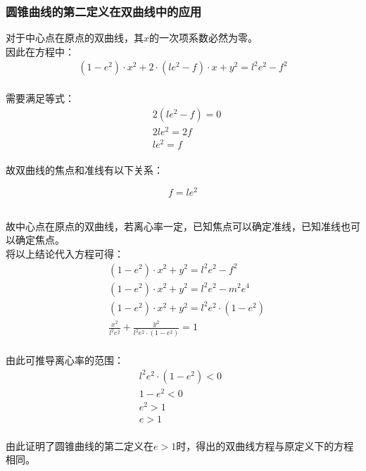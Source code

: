 \documentclass[UTF8]{ctexart}
\begin{document}
\subsubsection{圆锥曲线的第二定义在双曲线中的应用}
    \setcounter{equation}{0}
    对于中心点在原点的双曲线，其$x$的一次项系数必然为零。\\[3mm]
    因此在方程中：
    \begin{align}
        \left(1-e^2\right)\cdot x^2+2\cdot\left(le^2-f\right)\cdot x+y^2=l^2e^2-f^2
    \end{align}\\
    需要满足等式：
    \begin{align}
        &2(le^2-f)=0\\[3mm]
        &2le^2=2f\\[3mm]
        &le^2=f
    \end{align}\\
    故双曲线的焦点和准线有以下关系：
    \begin{large}
        \begin{equation*}
            f=le^2
        \end{equation*}
    \end{large}\\
    故中心点在原点的双曲线，若离心率一定，已知焦点可以确定准线，已知准线也可以确定焦点。\\[10mm]
    将以上结论代入方程可得：
    \begin{align}
        &\left(1-e^2\right)\cdot x^2+y^2=l^2e^2-f^2\\[3mm]
        &\left(1-e^2\right)\cdot x^2+y^2=l^2e^2-m^2e^4\\[3mm]
        &\left(1-e^2\right)\cdot x^2+y^2=l^2e^2\cdot\left(1-e^2\right)\\[3mm]
        &\frac{x^2}{l^2e^2}+\frac{y^2}{l^2e^2\cdot\left(1-e^2\right)}=1
    \end{align}\\
    由此可推导离心率的范围：
    \begin{align}
        &l^2e^2\cdot\left(1-e^2\right)<0~~~~~~\\[3mm]
        &1-e^2<0\\[3mm]
        &e^2>1\\[3mm]
        &e>1
    \end{align}\\
    由此证明了圆锥曲线的第二定义在$e>1$时，得出的双曲线方程与原定义下的方程相同。

\newpage
\end{document}
